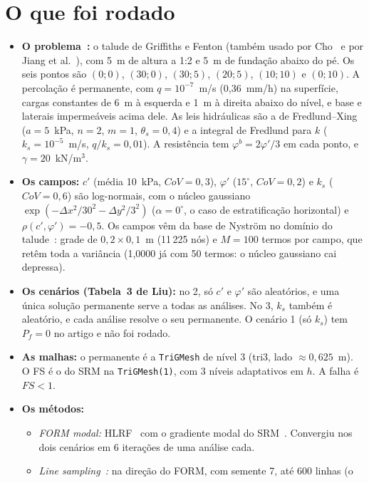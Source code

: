 \documentclass[11pt,a4paper]{article}
\begin{document}
\section{O que foi rodado}\label{sec:rodado}
\begin{itemize}
  \item \textbf{O problema~\cite{liu2024}:} o talude de Griffiths e Fenton (também usado por Cho~\cite{cho2010} e por
    Jiang et al.~\cite{jiang2014}), com 5~m de altura a 1:2 e 5~m de fundação abaixo do pé. Os seis pontos são
    $(0;0)$, $(30;0)$, $(30;5)$, $(20;5)$, $(10;10)$ e $(0;10)$. A percolação é permanente, com
    $q = 10^{-7}$~m/s (0,36~mm/h) na superfície, cargas constantes de 6~m à esquerda e 1~m à direita abaixo do nível, e
    base e laterais impermeáveis acima dele. As leis hidráulicas são a de Fredlund--Xing ($a = 5$~kPa, $n = 2$, $m = 1$,
    $\theta_s = 0{,}4$) e a integral de Fredlund para $k$ ($k_s = 10^{-5}$~m/s, $q/k_s = 0{,}01$). A resistência tem
    $\varphi^b = 2\varphi'/3$ em cada ponto, e $\gamma = 20$~kN/m$^3$.
  \item \textbf{Os campos:} $c'$ (média 10~kPa, $CoV = 0{,}3$), $\varphi'$ ($15^\circ$, $CoV = 0{,}2$) e $k_s$
    ($CoV = 0{,}6$) são log-normais, com o núcleo gaussiano $\exp(-\Delta x^2/30^2 - \Delta y^2/3^2)$ ($\alpha = 0^\circ$,
    o caso de estratificação horizontal) e $\rho(c', \varphi') = -0{,}5$. Os campos vêm da base de Nyström no domínio
    do talude~\cite{formulacao}: grade de $0{,}2 \times 0{,}1$~m (11\,225 nós) e $M = 100$ termos por campo, que retêm
    toda a variância (1,0000 já com 50 termos: o núcleo gaussiano cai depressa).
  \item \textbf{Os cenários (Tabela~3 de Liu):} no 2, só $c'$ e $\varphi'$ são aleatórios, e uma única solução
    permanente serve a todas as análises. No 3, $k_s$ também é aleatório, e cada análise resolve o seu permanente. O
    cenário 1 (só $k_s$) tem $P_f = 0$ no artigo e não foi rodado.
  \item \textbf{As malhas:} o permanente é a \texttt{TriGMesh} de nível 3 (tri3, lado $\approx 0{,}625$~m). O FS é o
    do SRM na \texttt{TriGMesh(1)}, com 3 níveis adaptativos em $h$. A falha é $FS < 1$.
  \item \textbf{Os métodos:}
    \begin{itemize}
      \item \emph{FORM modal:} HLRF~\cite{hasofer1974,rackwitz1978} com o gradiente modal do SRM~\cite{formulacao}.
        Convergiu nos dois cenários em 6 iterações de uma análise cada.
      \item \emph{Line sampling~\cite{koutsourelakis2004}:} na direção do FORM, com semente 7, até 600 linhas (o

\end{itemize}
\end{itemize}
\end{document}
